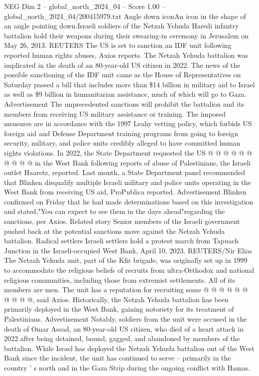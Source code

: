 \begin{textsample}{NEG Dim 2 – global\_north\_2024\_04 – Score 1.00 – global\_north\_2024\_04/200415979.txt}  \label{ex:f2_neg_185}
Angle down iconAn icon in the shape of an angle pointing down.Israeli soldiers of the Netzah Yehuda Haredi infantry battalion hold their weapons during their swearing-in ceremony in Jerusalem on May 26, 2013.
REUTERS The US is set to sanction an IDF unit following reported human rights abuses, Axios reports.
The Netzah Yehuda battalion was implicated in the death of an 80-year-old US citizen in 2022.
The news of the possible sanctioning of the IDF unit came as the House of Representatives on Saturday passed a bill that includes more than \$14 billion in military aid to Israel as well as \$9 billion in humanitarian assistance, much of which will go to Gaza.
Advertisement The unprecedented sanctions will prohibit the battalion and its members from receiving US military assistance or training.
The imposed measures are in accordance with the 1997 Leahy vetting policy, which forbids US foreign aid and Defense Department training programs from going to foreign security, military, and police units credibly alleged to have committed human rights violations.
In 2022, the State Department requested the US @ @ @ @ @ @ @ @ @ @ in the West Bank following reports of abuse of Palestinians, the Israeli outlet Haaretz, reported.
Last month, a State Department panel recommended that Blinken disqualify multiple Israeli military and police units operating in the West Bank from receiving US aid, ProPublica reported.
Advertisement Blinken confirmed on Friday that he had made determinations based on this investigation and stated,"You can expect to see them in the days ahead"regarding the sanctions, per Axios.
Related story Senior members of the Israeli government pushed back at the potential sanctions move against the Netzah Yehuda battalion.
Radical settlers Israeli settlers hold a protest march from Tapuach Junction in the Israeli-occupied West Bank, April 10, 2023.
REUTERS/Nir Elias The Netzah Yehuda unit, part of the Kfir brigade, was originally set up in 1999 to accommodate the religious beliefs of recruits from ultra-Orthodox and national religious communities, including those from extremist settlements.
All of its members are men.
The unit has a reputation for recruiting some @ @ @ @ @ @ @ @ @ @, said Axios.
Historically, the Netzah Yehuda battalion has been primarily deployed in the West Bank, gaining notoriety for its treatment of Palestinians.
Advertisement Notably, soldiers from the unit were accused in the death of Omar Assad, an 80-year-old US citizen, who died of a heart attack in 2022 after being detained, bound, gagged, and abandoned by members of the battalion.
While Israel has deployed the Netzah Yehuda battalion out of the West Bank since the incident, the unit has continued to serve -- primarily in the country ' s north and in the Gaza Strip during the ongoing conflict with Hamas.

\end{textsample}
